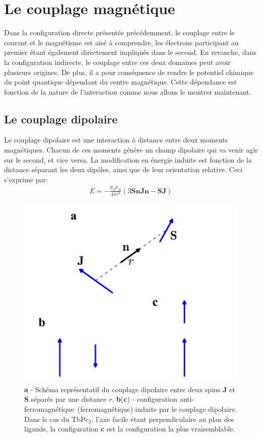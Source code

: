 \section{Le couplage magnétique}
Dans la configuration directe présentée précédemment, le couplage entre le courant et le magnétisme est aisé à comprendre, les électrons participant au premier étant également directement impliqués dans le second. En revanche, dans la configuration indirecte, le couplage entre ces deux domaines peut avoir plusieurs origines. De plus, il a pour conséquence de rendre le potentiel chimique du point quantique dépendant du centre magnétique. Cette dépendance est fonction de la nature de l'interaction comme nous allons le montrer maintenant.

\subsection{Le couplage dipolaire}
Le couplage dipolaire est une interaction à distance entre deux moments magnétiques. Chacun de ces moments génère un champ dipolaire qui va venir agir sur le second, et vice versa. La modification en énergie induite est fonction de la distance séparant les deux dipôles, ainsi que de leur orientation relative. Ceci s'exprime par:
\begin{eqnarray}
E = -\frac{\mu_0 \mu_B}{4\pi r^3}(3\mathbf{SnJn} - \mathbf{SJ}) \nonumber
\end{eqnarray}

\begin{figure}
\parbox{6.5cm}{
\includegraphics[scale=0.45]{Resultats/Chap1/Figure1/figure1.pdf} 
}
\parbox{7cm}{\caption{\textbf{a} - Schéma représentatif du couplage dipolaire entre deux spins \textbf{J} et \textbf{S} séparés par une distance $r$. \textbf{b}(\textbf{c}) - configuration anti-ferromagnétique~(ferromagnétique) induite par le couplage dipolaire. Dans le cas du TbPc$_2$, l'axe facile étant perpendiculaire au plan des ligands, la configuration \textbf{c} est la configuration la plus vraisemblable.}
\label{dipolaire}
}

\end{figure}

